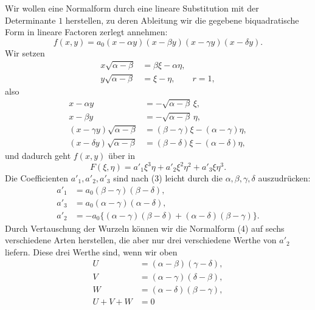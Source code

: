 \documentclass[11pt]{article}
\begin{document}
Wir wollen eine Normalform durch eine lineare Substitution mit der Determinante $1$ herstellen, zu deren Ableitung wir die gegebene biquadratische Form in lineare Factoren zerlegt annehmen:
\begin{equation}
 f(x,y)=a_0(x-\alpha y)(x-\beta y)(x-\gamma y)(x-\delta y).
\tag{1}
\end{equation}
Wir setzen
\begin{equation}
\begin{aligned}
 x\sqrt{\alpha-\beta}&=\beta\xi-\alpha\eta,\\
 y\sqrt{\alpha-\beta}&=\xi-\eta,
 \qquad r=1,
\end{aligned}
\tag{2}
\end{equation}
also
\begin{equation}
\begin{aligned}
 x-\alpha y&=-\sqrt{\alpha-\beta}\,\xi,\\
 x-\beta y&=-\sqrt{\alpha-\beta}\,\eta,\\
 (x-\gamma y)\sqrt{\alpha-\beta}&=(\beta-\gamma)\xi-(\alpha-\gamma)\eta,\\
 (x-\delta y)\sqrt{\alpha-\beta}&=(\beta-\delta)\xi-(\alpha-\delta)\eta,
\end{aligned}
\tag{3}
\end{equation}
und dadurch geht $f(x,y)$ über in
\begin{equation}
 F(\xi,\eta)=a'_1\xi^3\eta+a'_2\xi^2\eta^2+a'_3\xi\eta^3.
\tag{4}
\end{equation}
Die Coefficienten $a'_1,a'_2,a'_3$ sind nach (3) leicht durch die $\alpha,\beta,\gamma,\delta$ auszudrücken:
\begin{equation}
\begin{aligned}
 a'_1&=a_0(\beta-\gamma)(\beta-\delta),\\
 a'_3&=a_0(\alpha-\gamma)(\alpha-\delta),\\
 a'_2&=-a_0\{(\alpha-\gamma)(\beta-\delta)+(\alpha-\delta)(\beta-\gamma)\}.
\end{aligned}
\tag{5}
\end{equation}
Durch Vertauschung der Wurzeln können wir die Normalform (4) auf sechs verschiedene Arten herstellen, die aber nur drei verschiedene Werthe von $a'_2$ liefern. Diese drei Werthe sind, wenn wir oben
\begin{equation}
\begin{aligned}
 U&=(\alpha-\beta)(\gamma-\delta),\\
 V&=(\alpha-\gamma)(\delta-\beta),\\
 W&=(\alpha-\delta)(\beta-\gamma),\\
 U+V+W&=0
\end{aligned}
\tag{6}
\end{equation}
\end{document}

